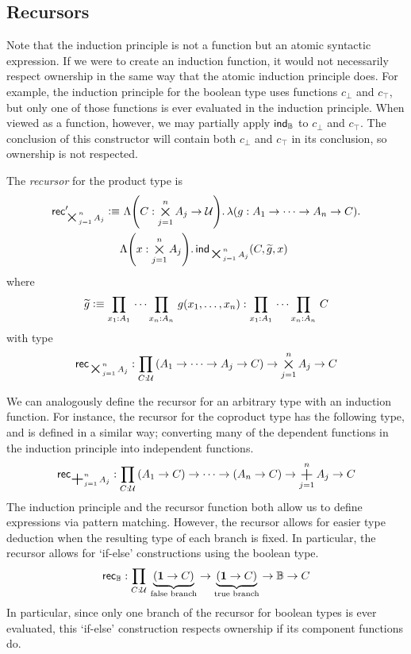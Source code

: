 \documentclass[11pt]{book}
\DeclareMathOperator*{\bigplus}{\scalerel*{+}{\textstyle\sum}}
\DeclareMathOperator*{\bigtimes}{\scalerel*{\times}{\textstyle\sum}}
\begin{document}
\subsection{Recursors}

Note that the induction principle is not a function but an atomic syntactic expression.
If we were to create an induction function, it would not necessarily respect ownership in the same way that the atomic induction principle does.
For example, the induction principle for the boolean type uses functions \( c_\bot \) and \( c_\top \), but only one of those functions is ever evaluated in the induction principle.
When viewed as a function, however, we may partially apply \( \mathsf{ind}_{\mathbb B} \) to \( c_\bot \) and \( c_\top \).
The conclusion of this constructor will contain both \( c_\bot \) and \( c_\top \) in its conclusion, so ownership is not respected.
\begin{defn}
  The \textit{recursor} for the product type is
  \begin{align*}
    \rec{\bigtimes_{j=1}^n A_j}' \defeq &\ \Lambda\qty(C:\bigtimes_{j=1}^n A_j \to \UU).\,\lambda\qty(g:A_1 \to \dots \to A_n \to C).\\
    &\Lambda\qty(x:\bigtimes_{j=1}^n A_j).\,\ind{\bigtimes_{j=1}^n A_j}(C,\widetilde g,x)
  \end{align*}
  where
  \[
    \widetilde g \defeq \prd{x_1:A_1} \cdots \prd{x_n:A_n} g(x_1, \dots, x_n) : \prd{x_1:A_1} \cdots \prd{x_n:A_n} C
  \]
  with type
  \[
    \rec{\bigtimes_{j=1}^n A_j} : \prd{C:\UU} (A_1 \to \dots \to A_j \to C) \to \bigtimes_{j=1}^n A_j \to C
  \]
\end{defn}
We can analogously define the recursor for an arbitrary type with an induction function.
For instance, the recursor for the coproduct type has the following type, and is defined in a similar way; converting many of the dependent functions in the induction principle into independent functions.
\[
  \rec{\bigplus_{j=1}^n A_j} : \prd{C:\UU} (A_1 \to C) \to \cdots \to (A_n \to C) \to \bigplus_{j=1}^n A_j \to C
\]
The induction principle and the recursor function both allow us to define expressions via pattern matching.
However, the recursor allows for easier type deduction when the resulting type of each branch is fixed.
In particular, the recursor allows for `if-else' constructions using the boolean type.
\[
  \rec{\mathbb B} : \prd{C:\UU} \underbrace{(\unit \to C)}_{\text{false branch}} \to \underbrace{(\unit \to C)}_{\text{true branch}} \to \mathbb B \to C
\]
In particular, since only one branch of the recursor for boolean types is ever evaluated, this `if-else' construction respects ownership if its component functions do.
\end{document}
